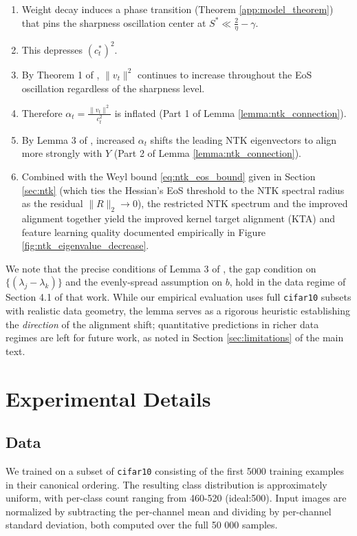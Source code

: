 \documentclass{article}
\begin{document}
\begin{enumerate}[label=(\roman*)]
    \item Weight decay induces a phase transition (Theorem \ref{app:model_theorem}) that pins the sharpness oscillation center at $S^* \ll \frac{2}{\eta} - \gamma$.
    \item This depresses $\left(c^*_t\right)^{2}$.
    \item By Theorem 1 of \citep{ntk_eos}, $\|v_t\|^2$ continues to increase throughout the EoS oscillation regardless of the sharpness level.
    \item Therefore $\alpha_t = \frac{\|v_t\|^2}{c_t^2}$ is inflated (Part 1 of Lemma \ref{lemma:ntk_connection}).
    \item By Lemma 3 of \citep{ntk_eos}, increased $\alpha_t$ shifts the leading NTK
          eigenvectors to align more strongly with $Y$ (Part 2 of Lemma \ref{lemma:ntk_connection}).
    \item Combined with the Weyl bound \eqref{eq:ntk_eos_bound} given in Section \ref{sec:ntk} (which ties the Hessian's EoS threshold to the NTK spectral radius as the residual $\|R\|_2 \to 0$), the restricted NTK spectrum and the improved alignment together yield the improved kernel target alignment (KTA) and feature learning quality documented empirically in Figure \ref{fig:ntk_eigenvalue_decrease}.
\end{enumerate}

We note that the precise conditions of Lemma 3 of \citep{ntk_eos}, the gap condition on $\{(\lambda_j - \lambda_k)\}$ and the evenly-spread assumption on $b$, hold in the data regime of Section 4.1 of that work. While our empirical evaluation uses full \texttt{cifar10} subsets with realistic data geometry, the lemma serves as a rigorous heuristic establishing the \emph{direction} of the alignment shift; quantitative predictions in richer data regimes are left for future work, as noted in Section \ref{sec:limitations} of the main text.

\section{Experimental Details}

\subsection{Data}
We trained on a subset of \texttt{cifar10} consisting of the first 5000 training examples in their canonical ordering. The resulting class distribution is approximately uniform, with per-class count ranging from 460-520 (ideal:500). Input images are normalized by subtracting the per-channel mean and dividing by per-channel standard deviation, both computed over the full 50 000 samples.  
\end{document}
